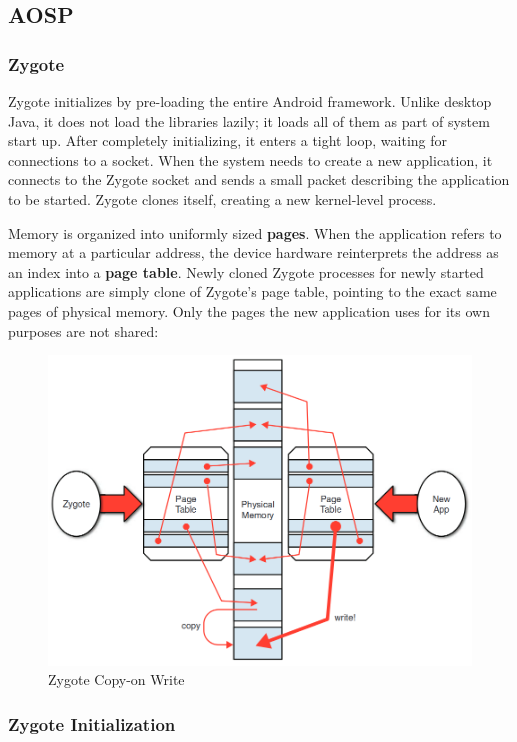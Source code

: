 \subsection{AOSP}
\label{task:20231114_aosp}

\subsubsection*{Zygote}
{Zygote} initializes by pre-loading the entire Android framework. Unlike desktop Java, it does not load the libraries lazily; it loads all of them as part of system start up. After completely initializing, it enters a tight loop, waiting for connections to a socket. When the system needs to create a new application, it connects to the Zygote socket and sends a small packet describing the application to be started. Zygote clones itself, creating a new kernel-level process.

Memory is organized into uniformly sized \textbf{pages}. When the application refers to memory at a particular address, the device hardware reinterprets the address as an index into a \textbf{page table}. Newly cloned Zygote processes for newly started applications are simply clone of Zygote's page table, pointing to the exact same pages of physical memory. Only the pages the new application uses for its own purposes are not shared:

\begin{figure}[H]
    \centering
    \includegraphics[width=.75\linewidth]{entries/2023/11/14/copyonwrite.png}
    \caption{Zygote Copy-on Write}
    \label{fig:copyonwrite}
\end{figure}

\subsubsection*{Zygote Initialization}

